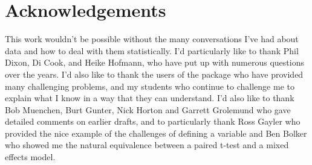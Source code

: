 \documentclass[article]{jss}
\begin{document}

\section{Acknowledgements} 
\label{sec:acknowledgements}

This work wouldn't be possible without the many conversations I've had about data and how to deal with them statistically. I'd particularly like to thank Phil Dixon, Di Cook, and Heike Hofmann, who have put up with numerous questions over the years. I'd also like to thank the users of the  package who have provided many challenging problems, and my students who continue to challenge me to explain what I know in a way that they can understand. I'd also like to thank Bob Muenchen, Burt Gunter, Nick Horton and Garrett Grolemund who gave detailed comments on earlier drafts, and to particularly thank Ross Gayler who provided the nice example of the challenges of defining a variable and Ben Bolker who showed me the natural equivalence between a paired t-test and a mixed effects model. 


\end{document}
